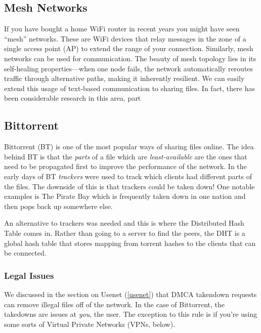 \subsection{Mesh Networks}

If you have bought a home WiFi router in recent years you might have seen
``mesh'' networks. These are WiFi devices that relay messages in the zone of a
single access point (AP) to extend the range of your connection. Similarly, mesh
networks can be used for communication.
\cite{kamaliAnixAnonymousBlackoutResistant} The beauty of mesh topology lies in its self-healing properties---when one node fails, the network automatically reroutes traffic through alternative paths, making it inherently resilient.
We can easily extend this usage of
text-based communication to sharing files. In fact, there has been considerable research in this area, part

\subsection{Bittorrent} \label{bittorrent}

Bittorrent (BT) is one of the most popular ways of sharing files online. The
idea behind BT is that the \emph{parts} of a file which are
\emph{least-available} are the ones that need to be propagated first to improve the performance of the network. In the early days of BT \emph{trackers} were used to track which clients had different parts of the files. The downside of this is that trackers could be taken down! One notable examples is The Pirate Bay which is frequently taken down in one nation and then pops back up somewhere else.

An alternative to trackers was needed and this is where the Distributed Hash Table comes in. Rather than going to a server to find the peers, the DHT is a global hash table that stores mapping from torrent hashes to the clients that can be connected.

\subsubsection{Legal Issues}

We discussed in the section on Usenet (\ref{usenet}) that DMCA takendown
requests can remove illegal files off of the network. In the case of Bittorrent,
the takedowns are issues at \emph{you}, the user. The exception to this rule is
if you're using some sorts of Virtual Private Networks (VPNs, below).

